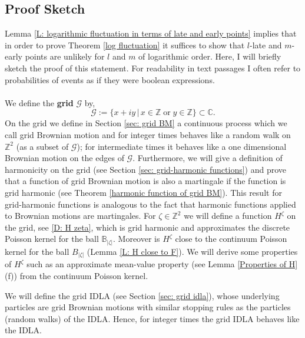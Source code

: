 \documentclass[11pt]{article}
\numberwithin{equation}{section}
\begin{document}
\subsection{Proof Sketch}
Lemma \ref{L: logarithmic fluctuation in terms of late and early points} 
implies that in order to prove Theorem \ref{log fluctuation} 
it suffices to show that $l$-late and $m$-early points 
are unlikely for $l$ and $m$ of logarithmic order. 
Here, I will briefly sketch the proof of this statement.
For readability in text passages I often refer to probabilities of events as if 
they were boolean expressions.
\\~\\
We define the \textbf{grid} $\mathcal{G}$ by,
\begin{equation} 
  \label{D: grid}
  \mathcal{G} := \{x+iy \,|\,
    x \in \mathbb{Z} \; \text{or} \;  y \in \mathbb{Z}\} \subset \mathbb{C}.
\end{equation}
On the grid we define in Section \ref{sec: grid BM} a continuous process 
which we call grid Brownian motion and for integer times behaves 
like a random walk on $\mathbb{Z}^2$ (as a subset of $\mathcal{G}$); 
for intermediate times it behaves like a one 
dimensional Brownian motion on the edges of $\mathcal{G}$. 
Furthermore, we will give a definition of harmonicity on the grid 
(see Section \ref{sec: grid-harmonic functions}) and prove 
that a function of grid Brownian motion is also a martingale if 
the function is grid harmonic (see Theorem \ref{harmonic function of grid BM}).  
This result for grid-harmonic functions is analogous to  
the fact that harmonic functions applied to Brownian motions are martingales.
For $\zeta \in \mathbb{Z}^2$ we will define  
a function $H^{\zeta}$ on the grid, see \eqref{D: H zeta}, which 
is grid harmonic and approximates the discrete Poisson kernel for the ball $\mathbb{B}_{|\zeta|}$. 
Moreover is $H^{\zeta}$ close to the continuum Poisson kernel for 
the ball $B_{|\zeta|}$ (Lemma \ref{L: H close to F}). 
We will derive some properties of $H^{\zeta}$ 
such as an approximate mean-value property (see Lemma \ref{Properties of H} (f)) 
from the continuum Poisson kernel. 

We will define the grid IDLA (see Section \ref{sec: grid idla}), 
whose underlying particles are grid Brownian motions with similar 
stopping rules as the particles (random walks) of the IDLA. Hence, for integer times 
the grid IDLA behaves like the IDLA.  
\end{document}
